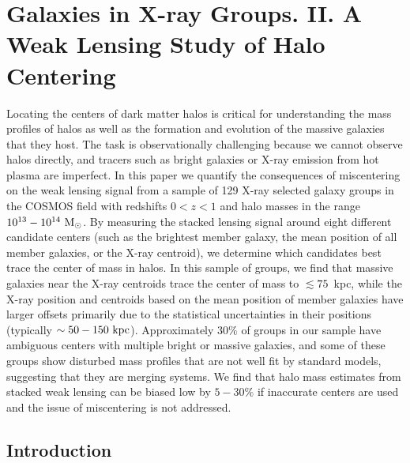 \chapter{Galaxies in X-ray Groups. II. A Weak Lensing Study of Halo Centering}

\label{chap:centering}

  
  Locating the centers of dark matter halos is critical for
  understanding the mass profiles of halos as well as the formation and
  evolution of the massive galaxies that they host. The task is observationally
  challenging because we cannot observe halos directly, and tracers
  such as bright galaxies or X-ray emission from hot plasma are
  imperfect. In this paper we quantify the consequences of miscentering on
  the weak lensing signal from a sample of 129 X-ray selected galaxy
  groups in the COSMOS field with redshifts $0<z<1$ and halo masses in
  the range $10^{13}-10^{14}~{\rm M_{\odot}}$. By measuring the
  stacked lensing signal around eight different candidate centers
  (such as the brightest member galaxy, the mean position of all
  member galaxies, or the X-ray centroid), we determine which
  candidates best trace the center of mass in halos. In this sample of
  groups, we find that massive galaxies near the X-ray centroids
  trace the center of mass to $\lesssim 75$~{\rm kpc}, while the X-ray 
  position and centroids based on the mean position of member galaxies
  have larger offsets primarily due to the statistical uncertainties in their
  positions (typically $\sim50-150~{\rm kpc}$). Approximately $30\%$ of
  groups in our sample have ambiguous centers with multiple bright or
  massive galaxies, and some of these groups show disturbed mass
  profiles that are not well fit by standard models, suggesting that
  they are merging systems. We find that halo mass estimates from stacked
  weak lensing can be biased low by $5-30\%$ if inaccurate centers are
  used and the issue of miscentering is not addressed. 

\section{Introduction}

